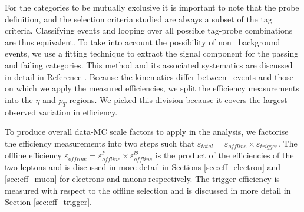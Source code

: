 For the categories to be mutually exclusive it is important to note that the probe definition, 
and the selection criteria studied are always a subset of the tag criteria.
Classifying events and looping over all possible tag-probe combinations are thus equivalent.
To take into account the possibility of non \dyll~background events, we use a fitting technique
to extract the signal component for the passing and failing categories. 
This method and its associated systematics are discussed in detail in Reference \cite{ref:tagprobe_mit_w}.
Because the kinematics differ between \dyll~events and those on which we apply the measured efficiencies,
we split the efficiency measurements into the $\eta$ and $p_T$ regions.
We picked this division because it covers the largest observed variation in efficiency.

To produce overall data-MC scale factors to apply in the analysis, we factorise the efficiency measurements
into two steps such that $\varepsilon_{total} = \varepsilon_{offline} \times \varepsilon_{trigger}$.
The offline efficiency $\varepsilon_{offline} = \varepsilon_{offline}^{l1} \times \varepsilon_{offline}^{l2}$
is the product of the efficiencies of the two leptons and is discussed in more detail in Sections \ref{sec:eff_electron}
and \ref{sec:eff_muon} for electrons and muons respectively.
The trigger efficiency is measured with respect to the offline selection and
 is discussed in more detail in Section \ref{sec:eff_trigger}.

